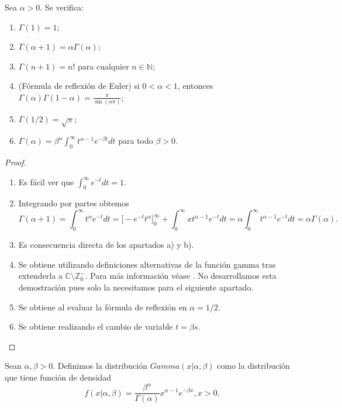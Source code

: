 \begin{prop}
    Sea $\alpha > 0$. Se verifica:
    \begin{enumerate}
        \item $\Gamma(1) = 1$;
	\item $\Gamma(\alpha+1) = \alpha\Gamma(\alpha)$;
    \item $\Gamma(n+1) = n!$ para cualquier $n \in \mathbb{N}$;
    \item (Fórmula de reflexión de Euler) si $0 < \alpha < 1$, entonces $\Gamma(\alpha) \Gamma(1- \alpha) = \frac{\pi}{\sin(\alpha \pi)}$;
    \item $\Gamma(1/2) = \sqrt{\pi}$;
    \item $\Gamma(\alpha) = \beta^\alpha\int_0^\infty t^{\alpha-1}e^{-\beta t} dt$ para todo $\beta > 0$.
    \end{enumerate}
\end{prop}
\begin{proof}
    \
    \begin{enumerate}
        \item Es fácil ver que $\int_{0}^\infty e^{-t} dt = 1$.
        \item Integrando por partes obtemos
        \[\Gamma(\alpha+1) = \int_0^{\infty}{t^{\alpha}e^{-t}dt} = \bigg[-e^{-t}t^\alpha\bigg]_0^{\infty} +
            \int_0^{\infty}{xt^{\alpha-1}e^{-t}dt} = \alpha\int_0^{\infty}{t^{\alpha-1}e^{-t}dt} = \alpha\Gamma(\alpha).\]
        \item Es consecuencia directa de los apartados a) y b).
        \item Se obtiene utilizando definiciones alternativas de la función gamma tras extenderla a $\mathbb{C} \setminus \mathbb{Z}^-_0$. Para más información véase \cite{gamma}. No desarrollamos esta demostración pues solo la necesitamos para el siguiente apartado.
        \item Se obtiene al evaluar la fórmula de reflexión en $\alpha = 1/2$.
        \item Se obtiene realizando el cambio de variable $t = \beta s$. \qedhere
    \end{enumerate}
\end{proof}

\begin{definition}
    Sean $\alpha, \beta > 0$. Definimos la distribución $Gamma(x | \alpha, \beta)$ como la distribución que tiene función de densidad
    \[f(x | \alpha, \beta) = \frac{\beta^\alpha}{\Gamma(\alpha)}x^{\alpha-1}e^{-\beta x}, x > 0.\]
\end{definition}

